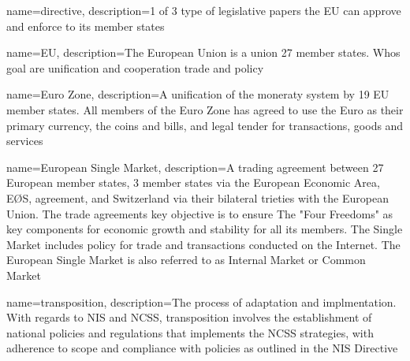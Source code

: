 
{
  name={directive},
  description={1 of 3 type of legislative papers the EU can approve and enforce to its member states}
}

{
  name={EU},
  description={The European Union is a union 27 member states. Whos goal are unification and cooperation trade and policy}
}

{
  name={Euro Zone},
  description={A unification of the moneraty system by 19 EU member states. All members of the Euro Zone has agreed to use the Euro as their primary currency, the coins and bills, and legal tender for transactions, goods and services}
}

{
  name={European Single Market},
  description={A trading agreement between 27 European member states, 3 member states via the European Economic Area, EØS, agreement, and Switzerland via their bilateral trieties with the European Union. The trade agreements key objective is to ensure The "Four Freedoms" as key components for economic growth and stability for all its members. The Single Market includes policy for trade and transactions conducted on the Internet. The European Single Market is also referred to as Internal Market or Common Market}
}

{
  name={transposition},
  description={The process of adaptation and implmentation. With regards to NIS and NCSS, transposition involves the establishment of national policies and regulations that implements the NCSS strategies, with adherence to scope and compliance with policies as outlined in the NIS Directive}
}











